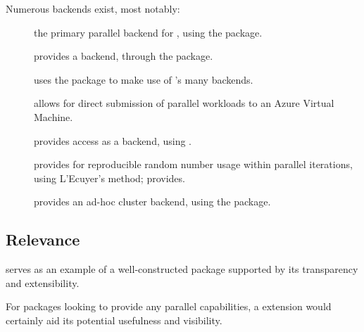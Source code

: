 Numerous backends exist, most notably:

\begin{description} \item[] the primary parallel backend for , using the  package\cite{corporation19}.
	\item[]
		provides a  backend, through the  package\cite{lewis20}.
	\item[]
		uses the  package to make use of 's many backends\cite{bengtsson20do}.
	\item[]
		allows for direct submission of parallel workloads to an Azure Virtual Machine\cite{hoang20}.
	\item[]
		provides  access as a backend, using \cite{weston17}.
	\item[]
		provides for reproducible random number usage within parallel
		iterations, using L'Ecuyer's method; provides\cite{gaujoux20}.
	\item[]
		provides an ad-hoc cluster backend, using the  package\cite{dosnow19}.
\end{description}

\subsection{Relevance}\label{relevance}

 serves as an example of a well-constructed package supported by
its transparency and extensibility.

For packages looking to provide any parallel capabilities, a  extension would certainly aid its potential usefulness and visibility.
